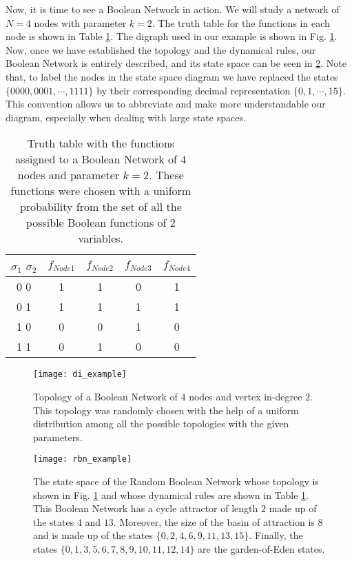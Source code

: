 Now, it is time to see a Boolean Network in action. We will study a network of $N=4$ nodes with parameter $k=2$. The truth table for the functions in each node is shown in Table \ref{tab:example}. The digraph used in our example is shown in Fig. \ref{fig:di_example}. Now, once we have established the topology and the dynamical rules, our Boolean Network is entirely described, and its state space can be seen in \ref{fig:rbn_example}. Note that, to label the nodes in the state space diagram we have replaced the states $\{0000,0001,\cdots,1111 \}$ by their corresponding decimal representation $\{0,1,\cdots,15\}$. This convention allows us to abbreviate and make more understandable our diagram, especially when dealing with large state spaces.

\begin{table}[h]
\centering
\begin{tabular}{ |c||c|c|c|c| } 
 \hline
 $\sigma_{1}$	$\sigma_{2}$ & $f_{Node 1}$ & $f_{Node 2}$ & $f_{Node 3}$ & $f_{Node 4}$ \\ 
 \hline
 \hline
 0	0 & 1& 1& 0& 1\\ 
 \hline
 0	1 & 1& 1& 1& 1\\
 \hline
 1	0 & 0& 0& 1& 0\\
 \hline
 1	1 & 0& 1& 0& 0\\
 \hline
\end{tabular}
 \caption[Truth table with the functions assigned to a Boolean Network of $4$ nodes and parameter $k=2$.]{Truth table with the functions assigned to a Boolean Network of $4$ nodes and parameter $k=2$. These functions were chosen with a uniform probability from the set of all the possible Boolean functions of $2$ variables.}
 \label{tab:example}
\end{table}

\begin{figure}[h]
	\centering
		\texttt{[image: di\_example]}
	\caption[The topology of a Boolean Network.]{Topology of a Boolean Network of $4$ nodes and vertex in-degree $2$. This topology was randomly chosen with the help of a uniform distribution among all the possible topologies with the given parameters.}
	\label{fig:di_example}
\end{figure}

\begin{figure}
	\centering
		\texttt{[image: rbn\_example]}
	\caption[The state space of a Random Boolean Network.]{The state space of the Random Boolean Network whose topology is shown in Fig. \ref{fig:di_example} and whose dynamical rules are shown in Table \ref{tab:example}. This Boolean Network has a cycle attractor of length $2$ made up of the states $4$ and $13$. Moreover, the size of the basin of attraction is $8$ and is made up of the states $\{0,2,4,6,9,11,13,15\}$. Finally, the states $\{0,1,3,5,6,7,8,9,10,11,12,14\}$ are the garden-of-Eden states.}
	\label{fig:rbn_example}
\end{figure}

